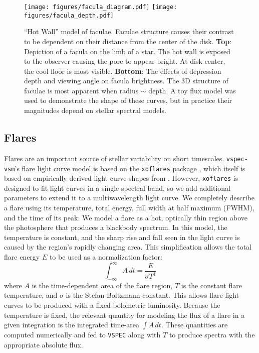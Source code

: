 \documentclass[linenumbers,5p,twocolumn,authoryear]{elsarticle}
\newcommand{\vspec}[1]{\texttt{VSPEC}#1}
\begin{document}
\begin{figure}
    \centering
    \texttt{[image: figures/facula\_diagram.pdf]}
    \texttt{[image: figures/facula\_depth.pdf]}
    \caption{
        ``Hot Wall'' model of faculae. Faculae structure causes their contrast to be dependent on their distance from the center of the disk. {\bf Top}: Depiction of a facula on the limb of a star. The hot wall is exposed to the observer causing the pore to appear bright. At disk center, the cool floor is most visible. {\bf Bottom}: The effects of depression depth and viewing angle on facula brightness. The 3D structure of faculae is most apparent when radius $\sim$ depth. A toy flux model was used to demonstrate the shape of these curves, but in practice their magnitudes depend on stellar spectral models.
        }
    \label{fig:fac_struct}
\end{figure}

\subsection{Flares \label{subsec:flares}}
Flares are an important source of stellar variability on short timescales. \texttt{vspec-vsm}'s flare light curve model is based on the \texttt{xoflares} package \citep{barclay2020}, which itself is based on empirically derived light curve shapes from \citet{davenport2016}. However, \texttt{xoflares} is designed to fit light curves in a single spectral band, so we add additional parameters to extend it to a multiwavelength light curve. We completely describe a flare using its temperature, total energy, full width at half maximum (FWHM), and the time of its peak. We model a flare as a hot, optically thin region above the photosphere that produces a blackbody spectrum. In this model, the temperature is constant, and the sharp rise and fall seen in the light curve is caused by the region's rapidly changing area. This simplification allows the total flare energy $E$ to be used as a normalization factor:
\begin{equation}
    \int_{-\infty}^{\infty}A\,dt = \frac{E}{\sigma T^4}
\end{equation}
where $A$ is the time-dependent area of the flare region, $T$ is the constant flare temperature, and $\sigma$ is the Stefan-Boltzmann constant. This allows flare light curves to be produced with a fixed bolometric luminosity. Because the temperature is fixed, the relevant quantity for modeling the flux of a flare in a given integration is the integrated time-area $\int A\,dt$. These quantities are computed numerically and fed to \vspec{} along with $T$ to produce spectra with the appropriate absolute flux.
\end{document}
